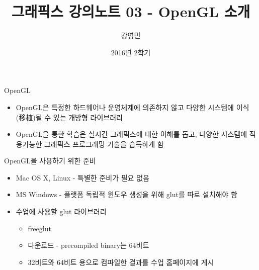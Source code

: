 \documentclass{beamer}
\title[3D 그래픽스 프로그래밍]{그래픽스 강의노트 03 - OpenGL 소개}
\author{강영민}
\institute{동명대학교}
\date{2016년 2학기}
\begin{document}
\begin{frame}
  \titlepage
\end{frame}



\begin{frame}{OpenGL}

\begin{itemize}
\item OpenGL은 특정한 하드웨어나 운영체제에 의존하지 않고 다양한 시스템에 이식(移植)될 수 있는 개방형 라이브러리
\item OpenGL을 통한 학습은 실시간 그래픽스에 대한 이해를 돕고, 다양한 시스템에 적용가능한 그래픽스 프로그래밍 기술을 습득하게 함
\end{itemize}
\end{frame}

\begin{frame}{OpenGL을 사용하기 위한 준비}

\begin{itemize}
\item Mac OS X, Linux - 특별한 준비가 필요 없음
\item MS Windows - 플랫폼 독립적 윈도우 생성을 위해 glut를 따로 설치해야 함
\end{itemize}


\begin{itemize}
\item 수업에 사용할 glut 라이브러리
	\begin{itemize}
	\item freeglut
	\item 다운로드 - precompiled binary는 64비트 
	\item 32비트와 64비트 용으로 컴파일한 결과를 수업 홈페이지에 게시
	\end{itemize}
\end{itemize}

\end{frame}
\end{document}

